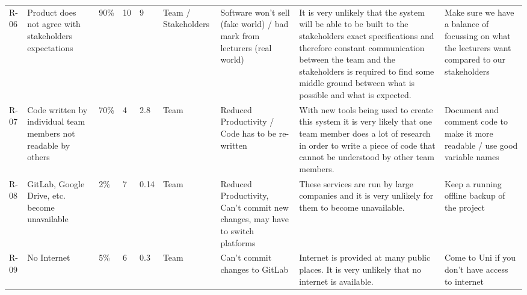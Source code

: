 \begin{table}
\begin{tabular}{lllllllll}
        R-06 & Product does not agree with stakeholders expectations                      & 90\%          & 10            & 9              & Team / Stakeholders & Software won’t sell (fake world) / bad mark from lecturers (real world)                      & It is very unlikely that the system will be able to be built to the stakeholders exact specifications and therefore constant communication between the team and the stakeholders is required to find some middle ground between what is possible and what is expected. & Make sure we have a balance of focussing on what the lecturers want compared to our stakeholders  \\
        R-07 & Code written by individual team members not readable by others             & 70\%          & 4             & 2.8            & Team                & Reduced Productivity / Code has to be re-written                                             & With new tools being used to create this system it is very likely that one team member does a lot of research in order to write a piece of code that cannot be understood by other team members.                                                                       & Document and comment code to make it more readable / use good variable names                      \\
        R-08 & GitLab, Google Drive, etc. become unavailable                              & 2\%           & 7             & 0.14           & Team                & Reduced Productivity, Can’t commit new changes, may have to switch platforms                 & These services are run by large companies and it is very unlikely for them to become unavailable.                                                                                                                                                                      & Keep a running offline backup of the project                                                      \\
        R-09 & No Internet                                                                & 5\%           & 6             & 0.3            & Team                & Can’t commit changes to GitLab                                                               & Internet is provided at many public places. It is very unlikely that no internet is available.                                                                                                                                                                         & Come to Uni if you don’t have access to internet                                                  \\

\end{tabular}
\end{table}
